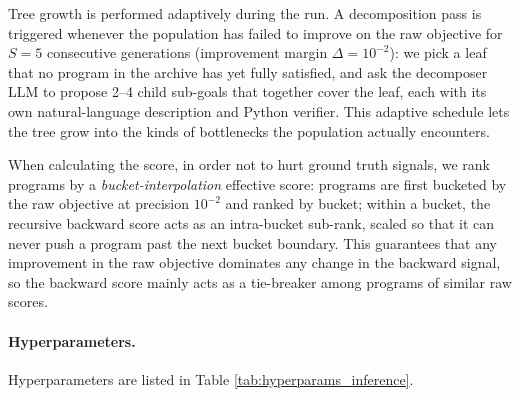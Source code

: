 Tree growth is performed adaptively during the run. A decomposition pass is triggered whenever
the population has failed to improve on the raw objective for $S=5$
consecutive generations (improvement margin $\Delta=10^{-2}$): we
pick a leaf that no program in the archive has yet fully satisfied,
and ask the decomposer LLM  to
propose 2--4 child sub-goals that together cover the leaf, each with
its own natural-language description and Python verifier. This
adaptive schedule lets the tree grow into the kinds of bottlenecks the population actually encounters.

When calculating the score, in order not to hurt ground truth signals, we rank programs by a
\emph{bucket-interpolation} effective score: programs are first
bucketed by the raw objective at precision $10^{-2}$ and ranked by
bucket; within a bucket, the recursive backward score acts as an
intra-bucket sub-rank, scaled so that it can never push a program
past the next bucket boundary. This guarantees that any improvement
in the raw objective dominates any change in the backward signal, so
the backward score mainly acts as a tie-breaker among programs of similar raw scores.


\paragraph{Hyperparameters.}
Hyperparameters are listed in Table \ref{tab:hyperparams_inference}.


